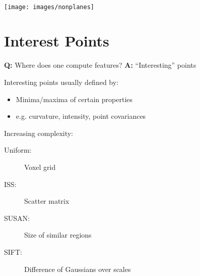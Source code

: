 \documentclass{beamer}
\begin{document}
\begin{frame}
  \begin{figure}
    \centering
  \end{figure}
\end{frame}
\begin{frame}
  \vspace{-0.5cm}
  \begin{figure}
    \centering
    \\
  \end{figure}
\end{frame}
\begin{frame}
  \begin{center}
    \texttt{[image: images/nonplanes]}
  \end{center}
\end{frame}

\section{Interest Points}
\begin{frame}
  \textbf{Q:} Where does one compute features? \textbf{A:} ``Interesting'' points

  Interesting points usually defined by:
  \begin{itemize}
  \item Minima/maxima of certain properties
  \item e.g. curvature, intensity, point covariances
  \end{itemize}
  
  Increasing complexity:
  \begin{description}
  \item[Uniform:] Voxel grid
  \item[ISS:] Scatter matrix
  \item[SUSAN:] Size of similar regions
  \item[SIFT:] Difference of Gaussians over scales
  \end{description}
\end{frame}
\begin{frame}
  \vspace{-0.5cm}
  \begin{figure}
    \centering
    \\
  \end{figure}
\end{frame}
\end{document}
